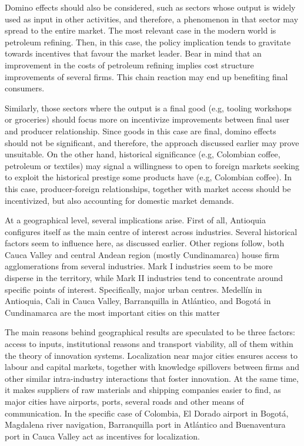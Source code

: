 \documentclass[12pt,a4paper]{article}
\begin{document}
Domino effects should also be considered, such as sectors whose output is widely used as input in other activities, and therefore, a phenomenon in that sector may spread to the entire market. The most relevant case in the modern world is petroleum refining. Then, in this case, the policy implication tends to gravitate towards incentives that favour the market leader. Bear in mind that an improvement in the costs of petroleum refining implies cost structure improvements of several firms. This chain reaction may end up benefiting final consumers.

Similarly, those sectors where the output is a final good (e.g, tooling workshops or groceries) should focus more on incentivize improvements between final user and producer relationship. Since goods in this case are final, domino effects should not be significant, and therefore, the approach discussed earlier may prove unsuitable. On the other hand, historical significance (e.g, Colombian coffee, petroleum or textiles) may signal a willingness to open to foreign markets seeking to exploit the historical prestige some products have (e.g, Colombian coffee). In this case, producer-foreign relationships, together with market access should be incentivized, but also accounting for domestic market demands.

At a geographical level, several implications arise. First of all, Antioquia configures itself as the main centre of interest across industries. Several historical factors seem to influence here, as discussed earlier. Other regions follow, both Cauca Valley and central Andean region (mostly Cundinamarca) house firm agglomerations from several industries. Mark I industries seem to be more disperse in the territory, while Mark II industries tend to concentrate around specific points of interest. Specifically, major urban centres. Medellín in Antioquia, Cali in Cauca Valley, Barranquilla in Atlántico, and Bogotá in Cundinamarca are the most important cities on this matter

The main reasons behind geographical results are speculated to be three factors: access to inputs, institutional reasons and transport viability, all of them within the theory of innovation systems. Localization near major cities ensures access to labour and capital markets, together with knowledge spillovers between firms and other similar intra-industry interactions that foster innovation. At the same time, it makes suppliers of raw materials and shipping companies easier to find, as major cities have airports, ports, several roads and other means of communication. In the specific case of Colombia, El Dorado airport in Bogotá, Magdalena river navigation, Barranquilla port in Atlántico and Buenaventura port in Cauca Valley act as incentives for localization.
\end{document}

